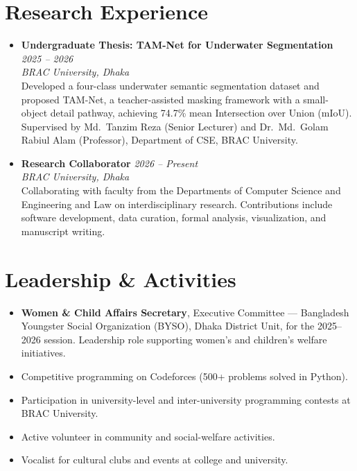 \documentclass[a4paper,11pt]{article}
\newcommand{\cvmeta}[1]{\textcolor{cvmuted}{\textit{#1}}}
\begin{document}
\section*{Research Experience}
\begin{itemize}[leftmargin=1.2em, labelsep=0.4em, itemsep=2pt, parsep=0pt, topsep=3pt]
    \item \textbf{Undergraduate Thesis: TAM-Net for Underwater Segmentation} \hfill \cvmeta{2025 -- 2026}\\
    \textit{BRAC University, Dhaka}\\
    Developed a four-class underwater semantic segmentation dataset and proposed TAM-Net, a teacher-assisted masking framework with a small-object detail pathway, achieving 74.7\% mean Intersection over Union (mIoU).\\
    Supervised by Md.\ Tanzim Reza (Senior Lecturer) and Dr.\ Md.\ Golam Rabiul Alam (Professor), Department of CSE, BRAC University.

    \item \textbf{Research Collaborator} \hfill \cvmeta{2026 -- Present}\\
    \textit{BRAC University, Dhaka}\\
    Collaborating with faculty from the Departments of Computer Science and Engineering and Law on interdisciplinary research. Contributions include software development, data curation, formal analysis, visualization, and manuscript writing.
\end{itemize}

\section*{Leadership \& Activities}
\begin{itemize}[leftmargin=1.2em, labelsep=0.4em, itemsep=2pt, parsep=0pt, topsep=3pt]
    \item \textbf{Women \& Child Affairs Secretary}, Executive Committee --- Bangladesh Youngster Social Organization (BYSO), Dhaka District Unit, for the 2025--2026 session. Leadership role supporting women's and children's welfare initiatives.
    \item Competitive programming on Codeforces (500+ problems solved in Python).
    \item Participation in university-level and inter-university programming contests at BRAC University.
    \item Active volunteer in community and social-welfare activities.
    \item Vocalist for cultural clubs and events at college and university.
\end{itemize}
\end{document}
